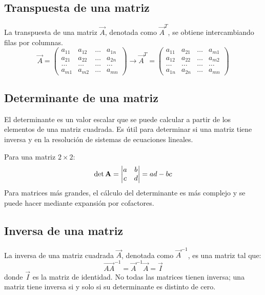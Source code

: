 \subsection{Transpuesta de una matriz}
La transpuesta de una matriz $\vec{A}$, denotada como $\vec{A}^T$, se obtiene intercambiando filas por columnas.
$$\vec{A} = \begin{pmatrix}
a_{11} & a_{12} & \ldots & a_{1n} \\
a_{21} & a_{22} & \ldots & a_{2n} \\
\ldots & \ldots & \ldots & \ldots \\
a_{m1} & a_{m2} & \ldots & a_{mn} 
\end{pmatrix} \rightarrow \vec{A}^T = \begin{pmatrix}
a_{11} & a_{21} & \ldots & a_{m1} \\
a_{12} & a_{22} & \ldots & a_{m2} \\
\ldots & \ldots & \ldots & \ldots \\
a_{1n} & a_{2n} & \ldots & a_{mn} 
\end{pmatrix}$$

\subsection{Determinante de una matriz}
El determinante es un valor escalar que se puede calcular a partir de los elementos de una matriz cuadrada. Es útil para determinar si una matriz tiene inversa y en la resolución de sistemas de ecuaciones lineales.

Para una matriz $2 \times 2$:
\begin{align}
\det \vec{A}
=
\begin{vmatrix}
a & b \\ 
c & d
\end{vmatrix}
=ad - bc\notag
\end{align}
Para matrices más grandes, el cálculo del determinante es más complejo y se puede hacer mediante expansión por cofactores.

\subsection{Inversa de una matriz}
La inversa de una matriz cuadrada $\vec{A}$, denotada como $\vec{A}^{-1}$, es una matriz tal que:
$$\vec{AA}^{-1} = \vec{A}^{-1} \vec{A} = \vec{I}$$
donde $\vec{I}$ es la matriz de identidad. No todas las matrices tienen inversa; una matriz tiene inversa si y solo si su determinante es distinto de cero.